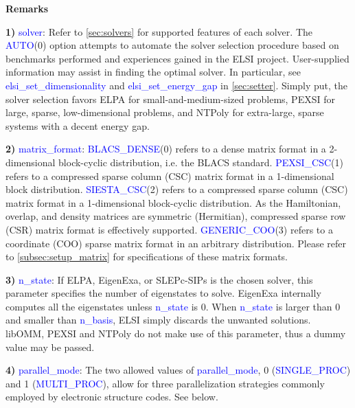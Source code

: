 \documentclass{report}
\begin{document}
\textbf{Remarks}

\textbf{1)} \textcolor{blue}{solver}: Refer to \ref{sec:solvers} for supported features of each solver. The \textcolor{blue}{AUTO}(0) option attempts to automate the solver selection procedure based on benchmarks performed and experiences gained in the ELSI project. User-supplied information may assist in finding the optimal solver. In particular, see \textcolor{blue}{elsi\_set\_dimensionality} and \textcolor{blue}{elsi\_set\_energy\_gap} in \ref{sec:setter}. Simply put, the solver selection favors ELPA for small-and-medium-sized problems, PEXSI for large, sparse, low-dimensional problems, and NTPoly for extra-large, sparse systems with a decent energy gap.

\textbf{2)} \textcolor{blue}{matrix\_format}: \textcolor{blue}{BLACS\_DENSE}(0) refers to a dense matrix format in a 2-dimensional block-cyclic distribution, i.e. the BLACS standard. \textcolor{blue}{PEXSI\_CSC}(1) refers to a compressed sparse column (CSC) matrix format in a 1-dimensional block distribution. \textcolor{blue}{SIESTA\_CSC}(2) refers to a compressed sparse column (CSC) matrix format in a 1-dimensional block-cyclic distribution. As the Hamiltonian, overlap, and density matrices are symmetric (Hermitian), compressed sparse row (CSR) matrix format is effectively supported. \textcolor{blue}{GENERIC\_COO}(3) refers to a coordinate (COO) sparse matrix format in an arbitrary distribution. Please refer to \ref{subsec:setup_matrix} for specifications of these matrix formats.

\textbf{3)} \textcolor{blue}{n\_state}: If ELPA, EigenExa, or SLEPc-SIPs is the chosen solver, this parameter specifies the number of eigenstates to solve. EigenExa internally computes all the eigenstates unless \textcolor{blue}{n\_state} is 0. When \textcolor{blue}{n\_state} is larger than 0 and smaller than \textcolor{blue}{n\_basis}, ELSI simply discards the unwanted solutions. libOMM, PEXSI and NTPoly do not make use of this parameter, thus a dummy value may be passed.

\textbf{4)} \textcolor{blue}{parallel\_mode}: The two allowed values of \textcolor{blue}{parallel\_mode}, 0 (\textcolor{blue}{SINGLE\_PROC}) and 1 (\textcolor{blue}{MULTI\_PROC}), allow for three parallelization strategies commonly employed by electronic structure codes. See below.
\end{document}
